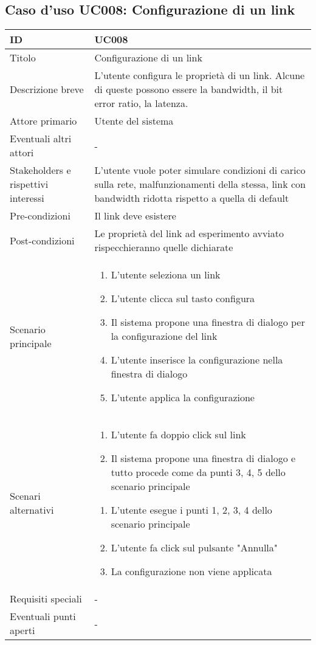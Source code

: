 \documentclass[../../main.tex]{subfiles}
\begin{document}
\subsection{Caso d’uso UC008: Configurazione di un link }
\begin{tabularx}{150mm}{|l|X|}
    \hline
    ID                                  & \textbf{UC008}\\
    \hline
    Titolo                              & Configurazione di un link \\
    \hline
    Descrizione breve                   & L'utente configura le proprietà di un link. Alcune di queste possono essere la bandwidth, il bit error ratio, la latenza.   \\
    \hline
    Attore primario                     & Utente del sistema   \\
    \hline
    Eventuali altri attori              & -   \\
    \hline
    Stakeholders e rispettivi interessi & L'utente vuole poter simulare condizioni di carico sulla rete, malfunzionamenti della stessa, link con bandwidth ridotta rispetto a quella di default   \\
    \hline
    Pre-condizioni                      &  Il link deve esistere  \\
    \hline
    Post-condizioni                     &  Le proprietà del link ad esperimento avviato rispecchieranno quelle dichiarate  \\
    \hline
    Scenario principale                 &  
     \begin{enumerate}
        \item L'utente seleziona un link
        \item L'utente clicca sul tasto configura
        \item Il sistema propone una finestra di dialogo per la configurazione del link 
        \item L'utente inserisce la configurazione nella finestra di dialogo 
        \item L'utente applica la configurazione
    \end{enumerate}\\
    \hline
    Scenari alternativi                 &  
    \begin{enumerate}
        \item L'utente fa doppio click sul link
        \item Il sistema propone una finestra di dialogo e tutto procede come da punti 3, 4, 5 dello scenario principale
    \end{enumerate}
    \begin{enumerate}
        \item L'utente esegue i punti 1, 2, 3, 4 dello scenario principale
        \item L'utente fa click sul pulsante "Annulla"
        \item La configurazione non viene applicata
    \end{enumerate} \\
    \hline
    Requisiti speciali                  & -   \\
    \hline
    Eventuali punti aperti              & -   \\
    \hline
\end{tabularx}
\newpage
\end{document}
